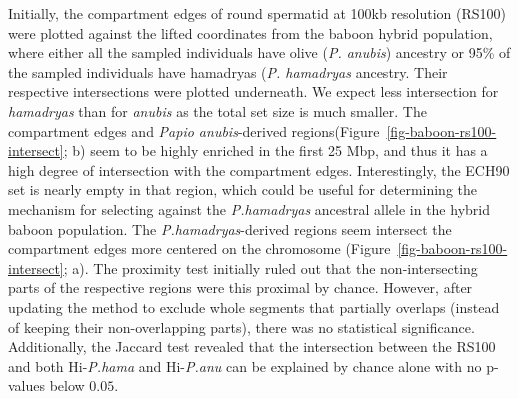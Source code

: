 \documentclass[
  11pt,
  a4paper,
]{scrbook}
\begin{document}
Initially, the compartment edges of round spermatid at 100kb resolution
(RS100) were plotted against the lifted coordinates from the baboon
hybrid population, where either all the sampled individuals have olive
(\emph{P. anubis}) ancestry or 95\% of the sampled individuals have
hamadryas (\emph{P. hamadryas} ancestry. Their respective intersections
were plotted underneath. We expect less intersection for
\emph{hamadryas} than for \emph{anubis} as the total set size is much
smaller. The compartment edges and \emph{Papio anubis}-derived
regions(Figure~\ref{fig-baboon-rs100-intersect}; b) seem to be highly
enriched in the first 25 Mbp, and thus it has a high degree of
intersection with the compartment edges. Interestingly, the ECH90 set is
nearly empty in that region, which could be useful for determining the
mechanism for selecting against the \emph{P.hamadryas} ancestral allele
in the hybrid baboon population. The \emph{P.hamadryas}-derived regions
seem intersect the compartment edges more centered on the chromosome
(Figure~\ref{fig-baboon-rs100-intersect}; a). The proximity test
initially ruled out that the non-intersecting parts of the respective
regions were this proximal by chance. However, after updating the method
to exclude whole segments that partially overlaps (instead of keeping
their non-overlapping parts), there was no statistical significance.
Additionally, the Jaccard test revealed that the intersection between
the RS100 and both Hi-\emph{P.hama} and Hi-\emph{P.anu} can be explained
by chance alone with no p-values below \(0.05\).
\end{document}
